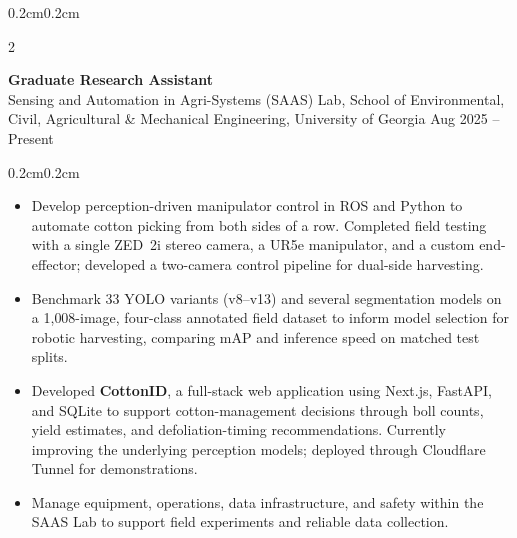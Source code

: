 \documentclass[10pt, letterpaper]{article}
\newenvironment{highlights}{%
    \begin{itemize}[topsep=0.08cm, parsep=0.08cm, partopsep=0pt,
                    itemsep=0pt, leftmargin=0.4cm + 10pt]
}{\end{itemize}}
\newenvironment{onecolentry}{%
    \begin{adjustwidth}{0.2cm}{0.2cm}
}{\end{adjustwidth}}
\newenvironment{twocolentry}[2][]{%
    \onecolentry
    \def\secondColumn{#2}
    \setcolumnwidth{\fill, 4.2cm}
    \begin{paracol}{2}
}{%
    \switchcolumn \raggedleft \secondColumn
    \end{paracol}
    \endonecolentry
}
\begin{document}
\begin{twocolentry}{Aug 2025 -- Present}
    \textbf{Graduate Research Assistant} \\
    Sensing and Automation in Agri-Systems (SAAS) Lab, School of Environmental,
    Civil, Agricultural \& Mechanical Engineering, University of Georgia
\end{twocolentry}
\begin{onecolentry}
    \begin{highlights}
        \item Develop perception-driven manipulator control in ROS and Python
              to automate cotton picking from both sides of a row. Completed
              field testing with a single ZED~2i stereo camera, a UR5e
              manipulator, and a custom end-effector; developed a two-camera
              control pipeline for dual-side harvesting.

        \item Benchmark 33 YOLO variants (v8--v13) and several segmentation
              models on a 1{,}008-image, four-class annotated field dataset
              to inform model selection for robotic harvesting, comparing
              mAP and inference speed on matched test splits.

        \item Developed \textbf{CottonID}, a full-stack web application using
              Next.js, FastAPI, and SQLite to support cotton-management
              decisions through boll counts, yield estimates, and
              defoliation-timing recommendations. Currently improving the
              underlying perception models; deployed through Cloudflare
              Tunnel for demonstrations.

        \item Manage equipment, operations, data infrastructure, and safety
              within the SAAS Lab to support field experiments and
              reliable data collection.
    \end{highlights}
    \vspace{0.12cm}
\end{onecolentry}
\end{document}

